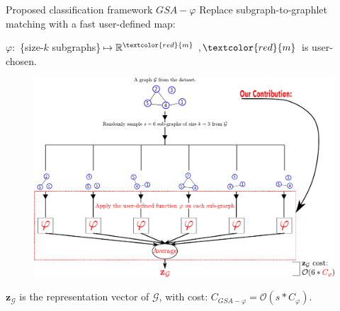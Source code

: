 \documentclass{beamer}
\begin{document}
\begin{frame}{Proposed classification framework $GSA-\varphi$}
	\footnotesize
	Replace subgraph-to-graphlet matching with a fast  user-defined map:
	\vfill
	{\centering $\varphi:$ \{size-$k$ subgraphs\}$\mapsto\mathbb{R}^{\textcolor{red}{m}}\enspace, {\textcolor{red}{m}}$ is user-chosen. \par}
	\begin{figure}[H]
		\centering
		\includegraphics[scale=0.45]{figs/GSA_phi.pdf}
		\vfill
	\end{figure}
	${\mathbf{z}}_\mathcal{G}$ is the representation vector of $\mathcal{G}$, with cost: $C_{GSA-\varphi}=\mathcal{O}(s*C_{\varphi})$.
	
\end{frame}



\end{document}
